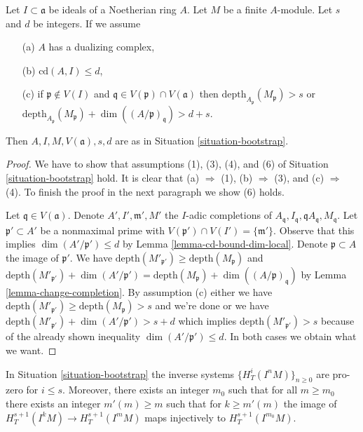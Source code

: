 \begin{lemma}
\label{lemma-bootstrap-bis-bis}
Let $I \subset \mathfrak a$ be ideals of a Noetherian ring $A$.
Let $M$ be a finite $A$-module. Let $s$ and $d$ be integers.
If we assume
\begin{enumerate}
\item[(a)] $A$ has a dualizing complex,
\item[(b)] $\text{cd}(A, I) \leq d$,
\item[(c)] if $\mathfrak p \not \in V(I)$ and
$\mathfrak q \in V(\mathfrak p) \cap V(\mathfrak a)$ then
$\text{depth}_{A_\mathfrak p}(M_\mathfrak p) > s$ or
$\text{depth}_{A_\mathfrak p}(M_\mathfrak p) +
\dim((A/\mathfrak p)_\mathfrak q) > d + s$.
\end{enumerate}
Then $A, I, M, V(\mathfrak a), s, d$ are as in
Situation \ref{situation-bootstrap}.
\end{lemma}

\begin{proof}
We have to show that assumptions (1), (3), (4), and (6) of
Situation \ref{situation-bootstrap} hold.
It is clear that (a) $\Rightarrow$ (1),
(b) $\Rightarrow$ (3), and (c) $\Rightarrow$ (4).
To finish the proof in the next paragraph we show (6) holds.

\medskip\noindent
Let $\mathfrak q \in V(\mathfrak a)$.
Denote $A', I', \mathfrak m', M'$
the $I$-adic completions of
$A_\mathfrak q, I_\mathfrak q, \mathfrak qA_\mathfrak q, M_\mathfrak q$.
Let $\mathfrak p' \subset A'$ be a nonmaximal prime with
$V(\mathfrak p') \cap V(I') = \{\mathfrak m'\}$.
Observe that this implies $\dim(A'/\mathfrak p') \leq d$
by Lemma \ref{lemma-cd-bound-dim-local}.
Denote $\mathfrak p \subset A$ the image of $\mathfrak p'$.
We have
$\text{depth}(M'_{\mathfrak p'}) \geq \text{depth}(M_\mathfrak p)$ and
$\text{depth}(M'_{\mathfrak p'}) +
\dim(A'/\mathfrak p') =
\text{depth}(M_\mathfrak p) +
\dim((A/\mathfrak p)_\mathfrak q)$
by Lemma \ref{lemma-change-completion}.
By assumption (c) either we have
$\text{depth}(M'_{\mathfrak p'}) \geq \text{depth}(M_\mathfrak p) > s$
and we're done or we have
$\text{depth}(M'_{\mathfrak p'}) +
\dim(A'/\mathfrak p') > s + d$ which implies
$\text{depth}(M'_{\mathfrak p'}) > s$ because of the already shown
inequality $\dim(A'/\mathfrak p') \leq d$. In both cases we
obtain what we want.
\end{proof}

\begin{lemma}
\label{lemma-bootstrap}
In Situation \ref{situation-bootstrap} the inverse systems
$\{H^i_T(I^nM)\}_{n \geq 0}$ are pro-zero for $i \leq s$.
Moreover, there exists an integer $m_0$ such that for all
$m \geq m_0$ there exists an integer $m'(m) \geq m$ such that for
$k \geq m'(m)$ the image of
$H^{s + 1}_T(I^kM) \to H^{s + 1}_T(I^mM)$
maps injectively to $H^{s + 1}_T(I^{m_0}M)$.
\end{lemma}

